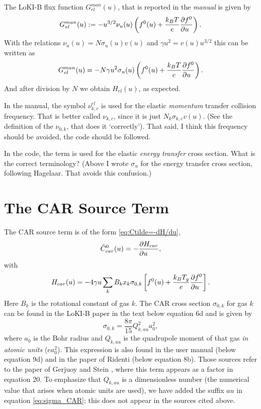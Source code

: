 \documentclass{book}
\begin{document}
The LoKI-B flux function $G^{man}_{el}(u)$, that is reported in the {\em manual}
\cite[eq. 12b]{Manual_2_2_0} is given by
\begin{equation}
	G^{man}_{el}(u)
	:= -u^{3/2}\nu_{u}(u)\left(f^0(u)+\frac{k_BT}{e}\PDEV{f^0}{u}\right).
	\label{eq:Ctilde0-el-loki}
\end{equation}
With the relations $\nu_{u}(u)=N\sigma_{u}(u)v(u)$ and $\gamma u^2=v(u)u^{3/2}$
this can be written as
\begin{equation}
	G^{man}_{el}(u) = -N\gamma u^2\sigma_{u}(u)\left(f^0(u)+\frac{k_BT}{e}\PDEV{f^0}{u}\right).
\end{equation}
And after division by $N$ we obtain $H_{el}(u)$, as expected.

\begin{framed}
	In the manual, the symbol $\nu^{el}_{k,c}$ is used for the elastic {\em momentum} transfer collision
	frequency. That is better called $\nu_{k,c}$, since it is just $N_k\sigma_{k,c}v(u)$. (See the
	definition of the $\nu_{0,k}$, that does it `correctly').
	That said, I think this frequency should be avoided, the code should be followed.

	In the code, the term  is used for the elastic {\em energy transfer}
	cross section. What is the correct terminology? (Above I wrote $\sigma_{u}$ for the
	energy transfer cross section, following Hagelaar. That avoids this confusion.)
\end{framed}

\section{The CAR Source Term}
The CAR source term is of the form \eqref{eq:Ctilde=-dH/du},
\begin{equation}
	\tilde{C}^0_{car}(u) = -\PDEV{H_{car}}{u},
\end{equation}
with
\begin{equation}
	H_{car}(u) = -4\gamma u\sum\limits_k B_k x_k\sigma_{0,k}\left[f^0(u) + \frac{k_BT_g}{e}\PDEV{f^0}{u}\right].
\end{equation}
Here $B_k$ is the rotational constant of gas $k$.
The CAR cross section $\sigma_{0,k}$ for gas $k$ can be found in the LoKI-B
paper \cite{Tejero2019} in the text below equation 6d and is given by
\begin{equation}
  \sigma_{0,k} = \frac{8\pi}{15}Q_{k,au}^2a_0^2,
  \label{eq:sigma_CAR}
\end{equation}
where $a_0$ is the Bohr radius and $Q_{k,au}$ is the quadrupole moment of that
gas {\em in atomic units} ($ea_0^2$).
This expression is also found in the user manual \cite{Manual_1_0_0} (below
equation 9d) and in the paper of Ridenti \etal \cite{Ridenti2015} (below
equation 8b). Those sources refer to the paper of Gerjuoy and Stein
\cite{Gerjuoy1955}, where this term appears as a factor in equation 20.
To emphasize that $Q_{k,au}$ is a dimensionless number (the numerical value
that arises when atomic units are used), we have added the suffix $au$ in equation
\eqref{eq:sigma_CAR}; this does not appear in the sources cited above.
\end{document}
